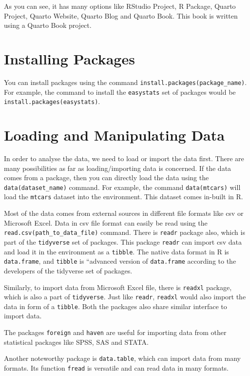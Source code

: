 \documentclass[
  letterpaper,
  paper =a4,
  twoside,
  openright,
  headsepline,
  footsepline,
  listof = totocnumbered,
  chapterprefix = true,
  firstiscover,
  parskip = full*]{scrbook}
\begin{document}
As you can see, it has many options like RStudio Project, R Package,
Quarto Project, Quarto Website, Quarto Blog and Quarto Book. This book
is written using a Quarto Book project.

\section{Installing Packages}\label{installing-packages}

You can install packages using the command
\texttt{install.packages(package\_name)}. For example, the command to
install the \texttt{easystats} set of packages would be
\texttt{install.packages(easystats)}.

\section{Loading and Manipulating
Data}\label{loading-and-manipulating-data}

In order to analyse the data, we need to load or import the data first.
There are many possibilities as far as loading/importing data is
concerned. If the data comes from a package, then you can directly load
the data using the \texttt{data(dataset\_name)} command. For example,
the command \texttt{data(mtcars)} will load the \texttt{mtcars} dataset
into the environment. This dataset comes in-built in R.

Most of the data comes from external sources in different file formats
like csv or Microsoft Excel. Data in csv file format can easily be read
using the \texttt{read.csv(path\_to\_data\_file)} command. There is
\texttt{readr} package also, which is part of the \texttt{tidyverse} set
of packages. This package \texttt{readr} can import csv data and load it
in the environment as a \texttt{tibble}. The native data format in R is
\texttt{data.frame}, and \texttt{tibble} is ``advanced version of
\texttt{data.frame} according to the developers of the tidyverse set of
packages.

Similarly, to import data from Microsoft Excel file, there is
\texttt{readxl} package, which is also a part of \texttt{tidyverse}.
Just like \texttt{readr}, \texttt{readxl} would also import the data in
form of a \texttt{tibble}. Both the packages also share similar
interface to import data.

The packages \texttt{foreign} and \texttt{haven} are useful for
importing data from other statistical packages like SPSS, SAS and STATA.

Another noteworthy package is \texttt{data.table}, which can import data
from many formats. Its function \texttt{fread} is versatile and can read
data in many formats.
\end{document}

